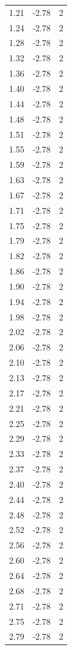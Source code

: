 \begin{longtable}{lrr}
  1.21 & -2.78 & 2 \\
  1.24 & -2.78 & 2 \\
  1.28 & -2.78 & 2 \\
  1.32 & -2.78 & 2 \\
  1.36 & -2.78 & 2 \\
  1.40 & -2.78 & 2 \\
  1.44 & -2.78 & 2 \\
  1.48 & -2.78 & 2 \\
  1.51 & -2.78 & 2 \\
  1.55 & -2.78 & 2 \\
  1.59 & -2.78 & 2 \\
  1.63 & -2.78 & 2 \\
  1.67 & -2.78 & 2 \\
  1.71 & -2.78 & 2 \\
  1.75 & -2.78 & 2 \\
  1.79 & -2.78 & 2 \\
  1.82 & -2.78 & 2 \\
  1.86 & -2.78 & 2 \\
  1.90 & -2.78 & 2 \\
  1.94 & -2.78 & 2 \\
  1.98 & -2.78 & 2 \\
  2.02 & -2.78 & 2 \\
  2.06 & -2.78 & 2 \\
  2.10 & -2.78 & 2 \\
  2.13 & -2.78 & 2 \\
  2.17 & -2.78 & 2 \\
  2.21 & -2.78 & 2 \\
  2.25 & -2.78 & 2 \\
  2.29 & -2.78 & 2 \\
  2.33 & -2.78 & 2 \\
  2.37 & -2.78 & 2 \\
  2.40 & -2.78 & 2 \\
  2.44 & -2.78 & 2 \\
  2.48 & -2.78 & 2 \\
  2.52 & -2.78 & 2 \\
  2.56 & -2.78 & 2 \\
  2.60 & -2.78 & 2 \\
  2.64 & -2.78 & 2 \\
  2.68 & -2.78 & 2 \\
  2.71 & -2.78 & 2 \\
  2.75 & -2.78 & 2 \\
  2.79 & -2.78 & 2 \\

\end{longtable}
